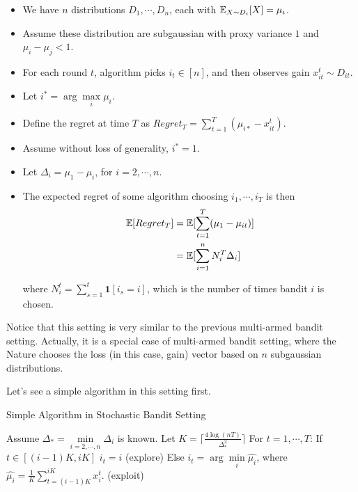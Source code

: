 \documentclass[../main.tex]{subfiles}
\begin{document}
\begin{itemize}
	\item We have $n$ distributions $D_1,\cdots , D_n$, each with $\mathbb{E}_{X\sim D_i} [X] = \mu_i$.
	\item Assume these distribution are subgaussian with proxy variance $1$ and $\mu_i - \mu_j <1$.
	\item For each round $t$, algorithm picks $i_t \in [n]$, and then observes gain $x^t_{it}\sim D_{it}$.
	\item Let $i^* = \arg\max\limits_i \mu_i$.
	\item Define the regret at time $T$ as $Regret_T=\sum\limits_{t=1}^T(\mu_{i*} - x^t_{it})$.
	\item Assume without loss of generality, $i^*=1$.
	\item Let $\Delta_i = \mu_1 - \mu_i$, for $i=2,\cdots,n$.
	\item The expected regret of some algorithm choosing $i_1,\cdots,i_T$ is then 
	\begin{equation*}
	\begin{aligned}
		\mathbb{E}[Regret_T] & = \mathbb{E}[\sum\limits_{t=1}^T (\mu_1-\mu_{it})] \\
		& =\mathbb{E}[\sum\limits_{i=1}^n N_i^T \Delta_i]
	\end{aligned}
	\end{equation*}
	
	where $N_i^t = \sum\limits_{s=1}^t \mathbf{1}[i_s = i]$, which is the number of times bandit $i$ is chosen.
\end{itemize}

Notice that this setting is very similar to the previous multi-armed bandit setting. Actually, it is a special case of multi-armed bandit setting, where the Nature chooses the loss (in this case, gain) vector based on $n$ subgaussian distributions.

Let's see a simple algorithm in this setting first.

\pagebreak

\begin{algorithm}[H]
	\caption{Simple Algorithm in Stochastic Bandit Setting}
	\begin{algorithmic}
		\STATE Assume $\Delta_* = \min\limits_{i=2,\cdots,n} \Delta_i$ is known.
		\STATE Let $K = \lceil \frac{4 \log(nT)}{\Delta_*^2} \rceil$
		\STATE For $t = 1,\cdots ,T$:
		\bindent 
		\STATE If $t\in [(i-1)K, iK]$
		\bindentt
				\STATE $i_t = i$ (explore)
		\eindentt
		\STATE Else
		\bindentt
				\STATE $i_t = \arg\min\limits_{i} \hat{\mu_i}$, where $\hat{\mu_i} = \frac{1}{K} \sum\limits_{t=(i-1)K}^{iK}x_i^t$. (exploit) 
		\eindentt
		\eindent
	\end{algorithmic}
\end{algorithm}
\end{document}
